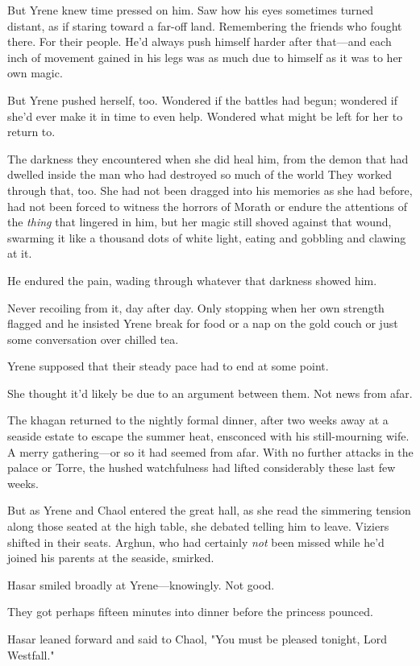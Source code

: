 But Yrene knew time pressed on him.
Saw how his eyes sometimes turned distant, as if staring toward a far-off land.
Remembering the friends who fought there.
For their people.
He'd always push himself harder after that---and each inch of movement gained in his legs was as much due to himself as it was to her own magic.

But Yrene pushed herself, too.
Wondered if the battles had begun;
wondered if she'd ever make it in time to even help.
Wondered what might be left for her to return to.

The darkness they encountered when she did heal him, from the demon that had dwelled inside the man who had destroyed so much of the world  They worked through that, too.
She had not been dragged into his memories as she had before, had not been forced to witness the horrors of Morath or endure the attentions of the \emph{thing} that lingered in him, but her magic still shoved against that wound, swarming it like a thousand dots of white light, eating and gobbling and clawing at it.

He endured the pain, wading through whatever that darkness showed him.

Never recoiling from it, day after day.
Only stopping when her own strength flagged and he insisted Yrene break for food or a nap on the gold couch or just some conversation over chilled tea.

Yrene supposed that their steady pace had to end at some point.

She thought it'd likely be due to an argument between them.
Not news from afar.

The khagan returned to the nightly formal dinner, after two weeks away at a seaside estate to escape the summer heat, ensconced with his still-mourning wife.
A merry gathering---or so it had seemed from afar.
With no further attacks in the palace or Torre, the hushed watchfulness had lifted considerably these last few weeks.

But as Yrene and Chaol entered the great hall, as she read the simmering tension along those seated at the high table, she debated telling him to leave.
Viziers shifted in their seats.
Arghun, who had certainly \emph{not} been missed while he'd joined his parents at the seaside, smirked.

Hasar smiled broadly at Yrene---knowingly.
Not good.

They got perhaps fifteen minutes into dinner before the princess pounced.

Hasar leaned forward and said to Chaol, "You must be pleased tonight, Lord Westfall."

